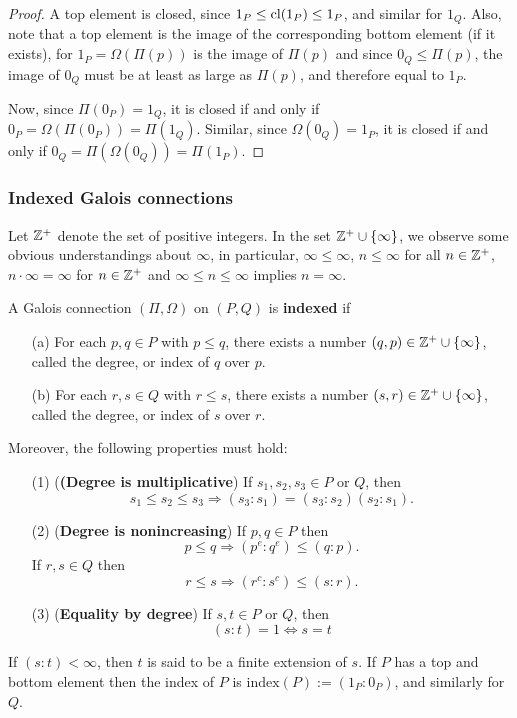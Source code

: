 \begin{proof}
A top element is closed, since $1_P\leq\mathrm{cl}(1_P)\leq 1_P$, and similar for $1_Q$. Also, note that a top element is the image of the corresponding bottom element (if it exists), for $1_P=\Omega(\Pi(p))$ is the image of $\Pi(p)$ and since $0_Q\leq\Pi(p)$, the image of $0_Q$ must be at least as large as $\Pi(p)$, and therefore equal to $1_P$.\par
Now, since $\Pi(0_P)=1_Q$, it is closed if and only if $0_P=\Omega(\Pi(0_P))=\Pi(1_Q)$. Similar, since $\Omega(0_Q)=1_P$, it is closed if and only if $0_Q=\Pi(\Omega(0_Q))=\Pi(1_P)$.
\end{proof}
\subsubsection{Indexed Galois connections}
Let $\mathbb{Z}^+$ denote the set of positive integers. In the set $\mathbb{Z}^+\cup\{\infty\}$, we observe some obvious understandings about $\infty$, in particular, $\infty\leq\infty$, $n\leq\infty$ for all $n\in\mathbb{Z}^+$, $n\cdot\infty=\infty$ for $n\in\mathbb{Z}^+$ and $\infty\leq n\leq\infty$ implies $n=\infty$.
\begin{definition}
A Galois connection $(\Pi,\Omega)$ on $(P,Q)$ is \textbf{indexed} if
\begin{itemize}
\item[(a)] For each $p,q\in P$ with $p\leq q$, there exists a number $(q,p)\in\mathbb{Z}^+\cup\{\infty\}$, called the degree, or index of $q$ over $p$.
\item[(b)] For each $r,s\in Q$ with $r\leq s$, there exists a number $(s,r)\in\mathbb{Z}^+\cup\{\infty\}$, called the degree, or index of $s$ over $r$.
\end{itemize}
Moreover, the following properties must hold:
\begin{itemize}
\item[(1)] (\textbf{(Degree is multiplicative}) If $s_1,s_2,s_3\in P$ or $Q$, then
\[s_1\leq s_2\leq s_3\Rightarrow (s_3:s_1)=(s_3:s_2)(s_2:s_1).\]
\item[(2)] (\textbf{Degree is nonincreasing}) If $p,q\in P$ then
\[p\leq q\Rightarrow (p^e:q^e)\leq(q:p).\]
If $r,s\in Q$ then
\[r\leq s\Rightarrow (r^c:s^c)\leq(s:r).\]
\item[(3)] (\textbf{Equality by degree}) If $s,t\in P$ or $Q$, then
\[(s:t)=1\Leftrightarrow s=t\]
\end{itemize}
If $(s:t)<\infty$, then $t$ is said to be a finite extension of $s$. If $P$ has a top and bottom element then the index of $P$ is $\mathrm{index}(P):=(1_P:0_P)$, and similarly for $Q$. 
\end{definition}
